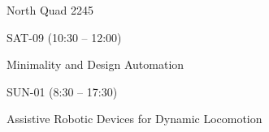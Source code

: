 \documentclass{article}
\begin{document}
\rssheader[2in]

\rssbig
\begin{center}
North Quad 2245
\end{center}

\vfill

\rssmed
\begin{center}
SAT-09 (10:30 -- 12:00)
\end{center}

\rsssm
\begin{center}
Minimality and Design Automation
\end{center}

\vfill

\rssmed
\begin{center}
SUN-01 (8:30 -- 17:30)
\end{center}

\rsssm
\begin{center}
Assistive Robotic Devices for Dynamic Locomotion
\end{center}

\vfill
\end{document}
